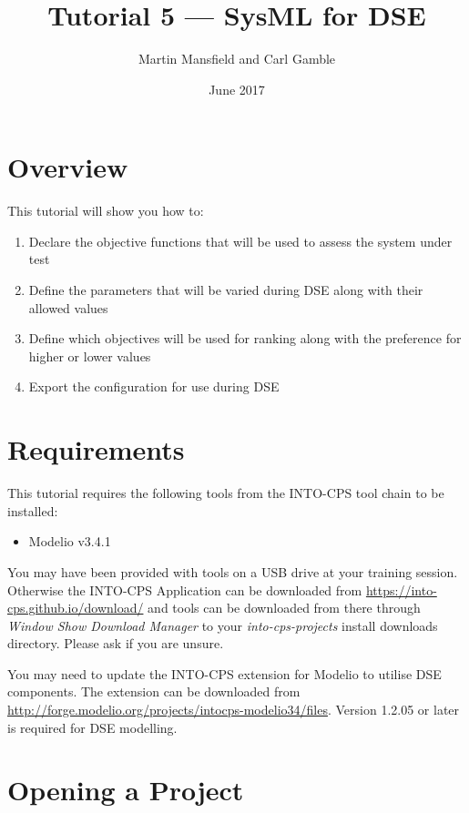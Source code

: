 \documentclass[11pt,a4paper]{../tutorial}
\title{Tutorial 5 --- SysML for DSE}
\date{June 2017}
\author{Martin Mansfield and Carl Gamble}
\begin{document}
\section*{Overview}

This tutorial will show you how to:

\begin{enumerate}[noitemsep]
\item Declare the objective functions that will be used to assess the system under test
\item Define the parameters that will be varied during DSE along with their allowed values
\item Define which objectives will be used for ranking along with the preference for higher or lower values
\item Export the configuration for use during DSE
\end{enumerate}

\section*{Requirements}

This tutorial requires the following tools from the INTO-CPS tool chain to be installed:

\begin{itemize}[noitemsep]
\item Modelio v3.4.1
\end{itemize}

You may have been provided with tools on a USB drive at your training session. Otherwise the INTO-CPS Application can be downloaded from \url{https://into-cps.github.io/download/} and tools can be downloaded from there through \emph{Window \menusep Show Download Manager} to your \emph{into-cps-projects} install downloads directory. Please ask if you are unsure.

\vspace{4mm}

You may need to update the INTO-CPS extension for Modelio to utilise DSE components. The extension can be downloaded from \mbox{\url{http://forge.modelio.org/projects/intocps-modelio34/files}}. Version 1.2.05 or later is required for DSE modelling.

\newpage

\section{Opening a Project}
\end{document}
